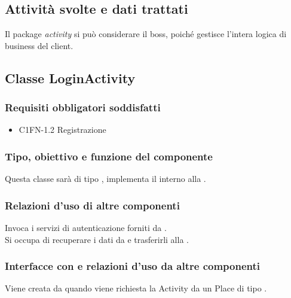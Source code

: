 \subsection*{Attivit\`a svolte e dati trattati} Il package \emph{activity} si
pu\`o considerare il boss, poich\'e gestisce l'intera logica di business del
client.

\subsection{Classe LoginActivity}
\subsubsection*{Requisiti obbligatori soddisfatti}
\begin{itemize}
	\item C1FN-1.2 Registrazione
\end{itemize}
\subsubsection*{Tipo, obiettivo e funzione del componente}
Questa classe sar\`a di tipo , implementa il 
interno alla .
\subsubsection*{Relazioni d'uso di altre componenti}
Invoca i servizi di autenticazione forniti da .\\
Si occupa di recuperare i dati da  e trasferirli alla
. 
\subsubsection*{Interfacce con e relazioni d'uso da altre componenti} 
Viene creata da  quando viene richiesta la Activity da
un Place di tipo .
